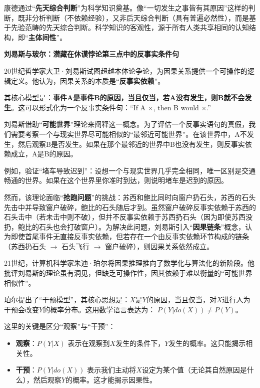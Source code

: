 康德通过“\textbf{先天综合判断}”为科学知识奠基。像“一切发生之事皆有其原因”这样的判断，既非分析判断（不依赖经验），又非后天综合判断（具有普遍必然性），而是基于先验范畴的先天综合判断。科学知识的客观性，源于所有人类共享相同的认知结构，即“\textbf{主体间性}”。

\textbf{刘易斯与玻尔：潜藏在休谟悖论第三点中的反事实条件句}

20世纪哲学家大卫·刘易斯试图超越本体论争论，为因果关系提供一个可操作的逻辑定义。他认为，因果关系的本质是“\textbf{反事实依赖}”。\textsuperscript{\cite{7}}

其核心模型是：\textbf{事件A是事件B的原因，当且仅当，若A没有发生，则B就不会发生}。这可以形式化为一个反事实条件句：“If A ×, then B would ×.”

刘易斯借助“\textbf{可能世界}”理论来阐释这一概念。为了评估一个反事实语句的真假，我们需要考察一个与现实世界尽可能相似的“最邻近可能世界”。在该世界中，A不发生，然后观察B是否发生。如果在那个最邻近的世界中B也没有发生，则反事实依赖成立，A是B的原因。

例如，验证“堵车导致迟到”：设想一个与现实世界几乎完全相同，唯一区别是交通畅通的世界。如果在这个世界里你准时到达，则说明堵车是迟到的原因。

然而，该理论面临“\textbf{抢跑问题}”的挑战：苏西和鲍比同时向窗户扔石头，苏西的石头先击中并导致窗户破碎，鲍比的石头随后才到。虽然窗户破碎反事实依赖于苏西的石头击中（若未击中则不破），但并不反事实依赖于苏西扔石头（因为即使苏西没扔，鲍比的石头也会打破窗户）。为解决此问题，刘易斯引入“\textbf{因果链条}”概念，认为即使首尾事件无直接反事实依赖，但若存在一个由反事实依赖环节构成的链条（苏西扔石头 $\rightarrow$ 石头飞行 $\rightarrow$ 窗户破碎），则因果关系依然成立。

21世纪，计算机科学家朱迪·珀尔将因果推理推向了数学化与算法化的新阶段。他批评刘易斯的理论虽有洞见，但缺乏可操作性，因其依赖于难以衡量的“可能世界相似性”。\textsuperscript{\cite{8}}

珀尔提出了“干预模型”，其核心思想是：$X$是$Y$的原因，当且仅当，对$X$进行人为干预会改变$Y$的概率分布。这用数学语言表达为： $P(Y | do(X)) \neq P(Y)$。

这里的关键是区分“观察”与“干预”：

\begin{itemize}
    \item \textbf{观察}：$P(Y | X)$ 表示在观察到$X$发生的条件下，$Y$发生的概率。这只能揭示相关性。
    \item \textbf{干预}：$P(Y | do(X))$ 表示我们主动将$X$设定为某个值（无论其自然原因是什么），然后观察$Y$的概率。这才能揭示因果性。
\end{itemize}

